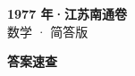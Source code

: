 \documentclass[zihao=-4, a4paper]{ctexart}
\begin{document}
\begin{center}
  {\Large\bfseries 1977 年·江苏南通卷}\\[4pt]
  {\large 数学 · 简答版}
\end{center}
\medskip
{}

\clearpage
{}
\begin{center}{\Large\bfseries 答案速查}\end{center}
\medskip

\end{document}
